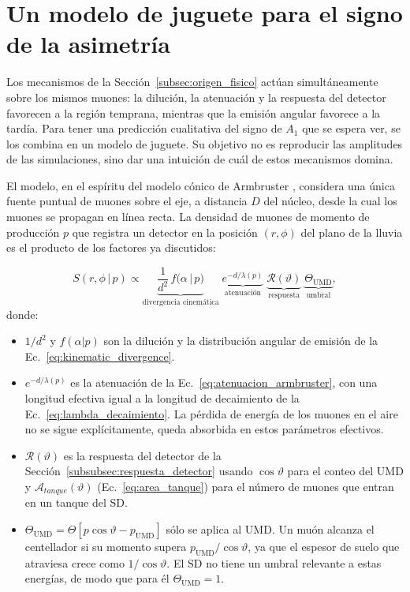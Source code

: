 \section{Un modelo de juguete para el signo de la asimetría}
\label{subsec:toy_models}

Los mecanismos de la Sección~\ref{subsec:origen_fisico} actúan simultáneamente sobre los mismos muones: la dilución, la atenuación y la respuesta del detector favorecen a la región temprana, mientras que la emisión angular favorece a la tardía. Para tener una predicción cualitativa del signo de $A_1$ que se espera ver, se los combina en un modelo de juguete. Su objetivo no es reproducir las amplitudes de las simulaciones, sino dar una intuición de cuál de estos mecanismos domina.

El modelo, en el espíritu del modelo cónico de Armbruster \cite{Armbruster2018}, considera una única fuente puntual de muones sobre el eje, a distancia $D$ del núcleo, desde la cual los muones se propagan en línea recta. La densidad de muones de momento de producción $p$ que registra un detector en la posición $(r,\phi)$ del plano de la lluvia es el producto de los factores ya discutidos:

\begin{equation}
	S(r,\phi\,|\,p) \propto
	\underbrace{\frac{1}{d^2}\,f\big(\alpha\,|\,p\big)}_{\text{divergencia cinemática}}\;
	\underbrace{e^{-d/\lambda(p)}}_{\text{atenuación}}\;
	\underbrace{\mathcal{R}(\vartheta)}_{\text{respuesta}}\;
	\underbrace{\Theta_{\mathrm{UMD}}}_{\text{umbral}} ,
	\label{eq:modelo_juguete}
\end{equation}
%
donde:

\begin{itemize}
	\item $1/d^2$ y $f(\alpha|p)$ son la dilución y la distribución angular de emisión de la Ec.~\ref{eq:kinematic_divergence}.
	
	\item $e^{-d/\lambda(p)}$ es la atenuación de la Ec.~\ref{eq:atenuacion_armbruster}, con una longitud efectiva igual a la longitud de decaimiento de la Ec.~\ref{eq:lambda_decaimiento}. La pérdida de energía de los muones en el aire no se sigue explícitamente, queda absorbida en estos parámetros efectivos.
	
	\item $\mathcal{R}(\vartheta)$ es la respuesta del detector de la Sección~\ref{subsubsec:respuesta_detector} usando $\cos\vartheta$ para el conteo del UMD y $\mathcal{A}_{tanque}(\vartheta)$ (Ec.~\ref{eq:area_tanque}) para el número de muones que entran en un tanque del SD.
	
	\item $\Theta_{\mathrm{UMD}} = \Theta\left[p\cos\vartheta - p_{\mathrm{UMD}}\right]$ sólo se aplica al UMD. Un muón alcanza el centellador si su momento supera $p_{\mathrm{UMD}}/\cos\vartheta$, ya que el espesor de suelo que atraviesa crece como $1/\cos\vartheta$. El SD no tiene un umbral relevante a estas energías, de modo que para él $\Theta_{\mathrm{UMD}}=1$.
\end{itemize}

